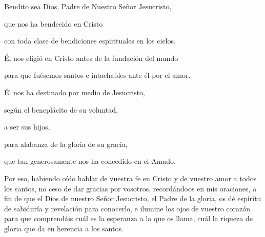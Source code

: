 	
		
		 
		
		
		\begin{scripture}
			Bendito sea Dios, Padre de Nuestro Señor Jesucristo,
			
			que nos ha bendecido en Cristo
			
			con toda clase de bendiciones espirituales en los cielos.
			
			Él nos eligió en Cristo antes de la fundación del mundo
			
			para que fuésemos santos e intachables ante él por el amor.
			
			Él nos ha destinado por medio de Jesucristo,
			
			según el beneplácito de su voluntad,
			
			a ser sus hijos,
			
			para alabanza de la gloria de su gracia,
			
			que tan generosamente nos ha concedido en el Amado.
			
			Por eso, habiendo oído hablar de vuestra fe en Cristo y de vuestro amor a todos los santos, no ceso de dar gracias por vosotros, recordándoos en mis oraciones, a fin de que el Dios de nuestro Señor Jesucristo, el Padre de la gloria, os dé espíritu de sabiduría y revelación para conocerlo, e ilumine los ojos de vuestro corazón para que comprendáis cuál es la esperanza a la que os llama, cuál la riqueza de gloria que da en herencia a los santos.
		\end{scripture}
	
	
		
		 
		
		
